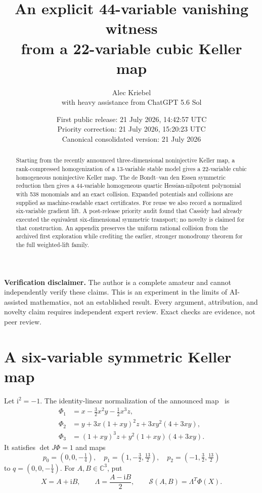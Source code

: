 \documentclass[11pt]{article}
\title{An explicit 44-variable vanishing witness\\
from a 22-variable cubic Keller map}
\author{Alec Kriebel\\[2pt]\large with heavy assistance from ChatGPT 5.6 Sol}
\date{First public release: 21 July 2026, 14:42:57 UTC\\
Priority correction: 21 July 2026, 15:20:23 UTC\\
Canonical consolidated version: 21 July 2026}
\newcommand{\C}{\mathbb C}
\newcommand{\ii}{\mathrm i}
\newcommand{\cS}{\mathcal S}
\begin{document}
\maketitle
\begin{abstract}
Starting from the recently announced three-dimensional noninjective Keller
map, a rank-compressed homogenization of a 13-variable stable model gives a
22-variable cubic homogeneous noninjective Keller map. The de Bondt--van den
Essen symmetric reduction then gives a 44-variable homogeneous quartic
Hessian-nilpotent polynomial with 538 monomials and an exact collision.
Expanded potentials and collisions are supplied as machine-readable exact
certificates. For reuse we also record a normalized six-variable gradient
lift. A post-release priority audit found that Cassidy had already executed
the equivalent six-dimensional symmetric transport; no novelty is claimed
for that construction.
An appendix preserves the uniform rational collision from the archived first
exploration while crediting the earlier, stronger monodromy theorem for the
full weighted-lift family.
\end{abstract}

\noindent\textbf{Verification disclaimer.}
The author is a complete amateur and cannot independently verify these
claims. This is an experiment in the limits of AI-assisted mathematics, not
an established result. Every argument, attribution, and novelty claim
requires independent expert review. Exact checks are evidence, not peer review.

\section{A six-variable symmetric Keller map}

Let $\ii^2=-1$. The identity-linear normalization of the announced
map~\cite{alpoge} is
\begin{align}
\Phi_1&=x-\frac32x^2y-\frac12x^3z,\nonumber\\
\Phi_2&=y+3x(1+xy)^2z+3xy^2(4+3xy),\label{eq:phi}\\
\Phi_3&=(1+xy)^3z+y^2(1+xy)(4+3xy).\nonumber
\end{align}
It satisfies $\det J\Phi=1$ and maps
\begin{equation}
p_0=(0,0,-\tfrac14),\quad
p_1=(1,-\tfrac32,\tfrac{13}2),\quad
p_2=(-1,\tfrac32,\tfrac{13}2)
\label{eq:points}
\end{equation}
to $q=(0,0,-\tfrac14)$. For $A,B\in\C^3$, put
\begin{equation}
X=A+\ii B,\qquad \Lambda=\frac{A-\ii B}{2},\qquad
\boxed{\cS(A,B)=\Lambda^T\Phi(X).}
\label{eq:S}
\end{equation}
\end{document}
